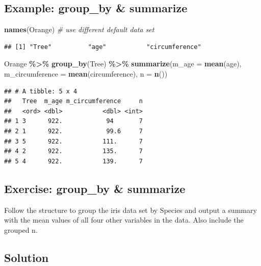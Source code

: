 \documentclass[
]{book}
\newenvironment{Shaded}{\begin{snugshade}}{\end{snugshade}}
\newcommand{\AttributeTok}[1]{\textcolor[rgb]{0.13,0.29,0.53}{#1}}
\newcommand{\CommentTok}[1]{\textcolor[rgb]{0.56,0.35,0.01}{\textit{#1}}}
\newcommand{\FunctionTok}[1]{\textcolor[rgb]{0.13,0.29,0.53}{\textbf{#1}}}
\newcommand{\NormalTok}[1]{#1}
\newcommand{\SpecialCharTok}[1]{\textcolor[rgb]{0.81,0.36,0.00}{\textbf{#1}}}
\begin{document}
\subsection{Example: group\_by \& summarize}\label{example-group_by-summarize}

\begin{Shaded}
\begin{Highlighting}[]
\FunctionTok{names}\NormalTok{(Orange) }\CommentTok{\# use different default data set}
\end{Highlighting}
\end{Shaded}

\begin{verbatim}
## [1] "Tree"          "age"           "circumference"
\end{verbatim}

\begin{Shaded}
\begin{Highlighting}[]
\NormalTok{Orange }\SpecialCharTok{\%\textgreater{}\%} 
  \FunctionTok{group\_by}\NormalTok{(Tree) }\SpecialCharTok{\%\textgreater{}\%} 
  \FunctionTok{summarize}\NormalTok{(}\AttributeTok{m\_age =} \FunctionTok{mean}\NormalTok{(age),}
            \AttributeTok{m\_circumference =} \FunctionTok{mean}\NormalTok{(circumference),}
            \AttributeTok{n =} \FunctionTok{n}\NormalTok{())}
\end{Highlighting}
\end{Shaded}

\begin{verbatim}
## # A tibble: 5 x 4
##   Tree  m_age m_circumference     n
##   <ord> <dbl>           <dbl> <int>
## 1 3      922.            94       7
## 2 1      922.            99.6     7
## 3 5      922.           111.      7
## 4 2      922.           135.      7
## 5 4      922.           139.      7
\end{verbatim}

\subsection{Exercise: group\_by \& summarize}\label{exercise-group_by-summarize}

Follow the structure to group the iris data set by Species and output a summary with the mean values of all four other variables in the data.
Also include the grouped n.

\subsection{Solution}\label{solution-4}
\end{document}
